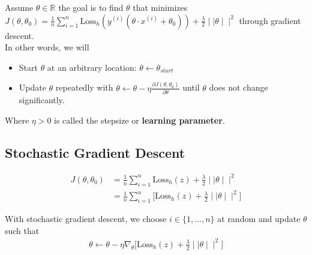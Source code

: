 Assume $\theta \in \mathbb{R}$ the goal is to find $\theta$ that minimizes $J(\theta , \theta _0) = \frac{1}{n} \sum _{i=1}^{n} \text {Loss}_ h (y^{(i)} (\theta \cdot x^{(i)} + \theta _0 )) + \frac{\lambda }{2} \mid \mid \theta \mid \mid ^2$ through gradient descent.\\

In other words, we will
\begin{itemize}
\item Start $\theta$ at an arbitrary location: $\theta \leftarrow \theta _{start}$
\item Update $\theta$ repeatedly with $\theta \leftarrow \theta - \eta \frac{\partial J(\theta , \theta _0)}{\partial \theta }$ until $\theta$ does not change significantly.
\end{itemize}

Where $\eta >0$ is called the stepsize or \textbf{learning parameter}.

\subsection{Stochastic Gradient Descent}

\begin{align*}
J(\theta , \theta _0) &= \frac{1}{n} \sum _{i=1}^{n} \text {Loss}_ h (z) + \frac{\lambda }{2} \mid \mid \theta \mid \mid ^2\\
&= \frac{1}{n} \sum _{i=1}^{n}\big [ \text {Loss}_ h (z) + \frac{\lambda }{2} \mid \mid \theta \mid \mid ^2 \big ]
\end{align*}

With stochastic gradient descent, we choose $i \in \big \{ 1,...,n \big \}$ at random and update $\theta$ such that\\

\begin{align*}
\theta \leftarrow \theta - \eta \nabla _{\theta } \big [\text {Loss}_ h(z) + \frac{\lambda }{2}\mid \mid \theta \mid \mid ^2 \big ]
\end{align*}
